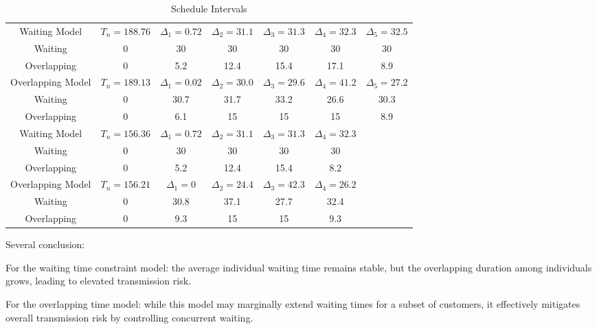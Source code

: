 \documentclass{article}
\begin{document}
\begin{table}[ht]
    \centering
    \caption{Schedule Intervals}
    \begin{tabular}{ccccccc}
    \hline
    \hline
    Waiting Model & $T_{n} = 188.76$ & $\Delta_1= 0.72$ & $\Delta_2= 31.1$ & $\Delta_3=31.3$ & $\Delta_4 = 32.3$ & $\Delta_5=32.5$ \\
    Waiting  &  0 & 30  & 30  & 30 & 30 & 30 \\
    Overlapping & 0 &  5.2 & 12.4 & 15.4 & 17.1 & 8.9 \\ 
    \hline
    Overlapping Model & $T_{n} = 189.13$ & $\Delta_1= 0.02$ & $\Delta_2= 30.0$ & $\Delta_3 = 29.6$ & $\Delta_4= 41.2$ & $\Delta_5 =27.2$ \\
    Waiting   & 0  & 30.7 & 31.7  & 33.2 & 26.6 & 30.3 \\
    Overlapping & 0 & 6.1 & 15  & 15 & 15 & 8.9 \\
    \hline
    Waiting Model & $T_{n} = 156.36$ & $\Delta_1= 0.72$ & $\Delta_2= 31.1$ & $\Delta_3=31.3$ & $\Delta_4 = 32.3$ \\
    Waiting  & 0 & 30  & 30  & 30 & 30 \\
    Overlapping & 0 &  5.2 & 12.4 & 15.4 & 8.2 \\ 
    \hline
    Overlapping Model & $T_{n} = 156.21$ & $\Delta_1= 0$ & $\Delta_2= 24.4$ & $\Delta_3 = 42.3$ & $\Delta_4= 26.2$ \\
    Waiting  &  0  & 30.8 & 37.1  & 27.7 & 32.4 \\
    Overlapping & 0 & 9.3 & 15  & 15  & 9.3 \\
    \hline
    \end{tabular}
  \end{table}

Several conclusion:

For the waiting time constraint model: the average individual waiting time remains stable, but the overlapping duration among individuals grows, leading to elevated transmission risk.

For the overlapping time model: while this model may marginally extend waiting times for a subset of customers, it effectively mitigates overall transmission risk by controlling concurrent waiting.
\end{document}
